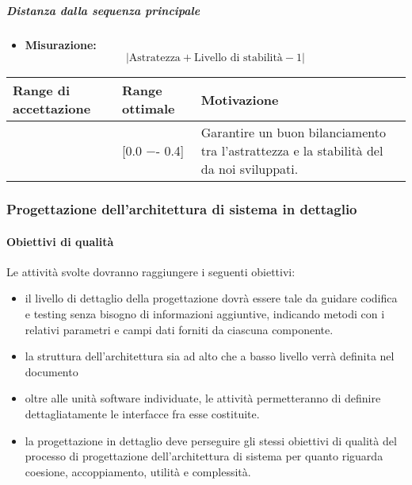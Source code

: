 \subparagraph{Distanza dalla sequenza principale}

\begin{itemize}
\item \textbf{Misurazione:}
\begin{displaymath}
{|\text{Astratezza} + \text{Livello di stabilità} - 1|}
\end{displaymath}
\end{itemize}

\begin{center}
		\begin{tabular}{|P{2.5cm}|P{2.5cm}|P{6cm}|}
		\hline
			\textbf{Range di accettazione}	& \textbf{Range ottimale} & \textbf{Motivazione} \\
			\hline
			[0.0 −- 1] & [0.0 −- 0.4] &	Garantire un buon bilanciamento tra l’astrattezza e la stabilità del  da noi sviluppati.\\
			\hline
			\end{tabular}
\end{center}

\subsubsection{Progettazione dell'architettura di sistema in dettaglio}

\paragraph{Obiettivi di qualità}
Le attività svolte dovranno raggiungere i seguenti obiettivi:
\begin{itemize}
\item il livello di dettaglio della progettazione dovrà essere tale da guidare codifica e testing senza bisogno di informazioni aggiuntive, indicando metodi con i relativi parametri e campi dati forniti da ciascuna componente.
\item la struttura dell'architettura sia ad alto che a basso livello verrà definita nel documento \DDP
\item oltre alle unità software individuate, le attività permetteranno di definire dettagliatamente le interfacce fra esse costituite.
\item la progettazione in dettaglio deve perseguire gli stessi obiettivi di qualità del processo di progettazione dell'architettura di sistema per quanto riguarda coesione, accoppiamento, utilità e complessità.
\end{itemize}

